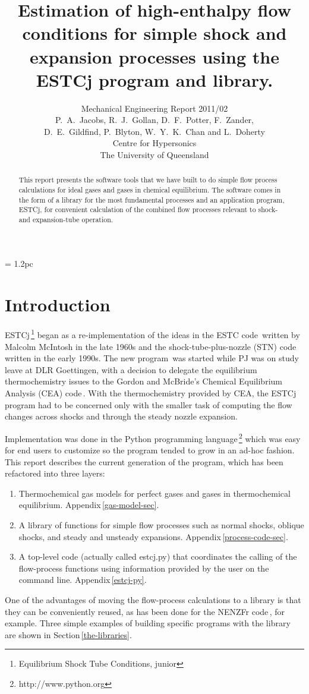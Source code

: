 \documentclass[landscape,12pt,a4paper]{article}
\title{
  Estimation of high-enthalpy flow conditions
  for simple shock and expansion processes using
  the ESTCj program and library.
}
\author{
  Mechanical Engineering Report 2011/02 \\
  P.~A.~Jacobs, R.~J.~Gollan, D.~F.~Potter, F.~Zander,\\
  D.~E.~Gildfind, P.~Blyton, W.~Y.~K.~Chan and L.~Doherty \\
  Centre for Hypersonics\\
  The University of Queensland
}
\begin{document}
\maketitle

\baselineskip = 1.2pc

\begin{abstract}
This report presents the software tools that we have built to do simple
flow process calculations for ideal gases and gases in chemical equilibrium.
The software comes in the form of a library for the most fundamental processes and
an application program, ESTCj, for convenient calculation of 
the combined flow processes relevant to shock- and expansion-tube operation.
\end{abstract}

\newpage
\tableofcontents


\newpage
\section{Introduction}
%
ESTCj\,\footnote{Equilibrium Shock Tube Conditions, junior} 
began as a re-implementation of the ideas in the ESTC code\,\cite{mcintosh_70}
written by Malcolm McIntosh in the late 1960s and 
the shock-tube-plus-nozzle (STN) code\,\cite{krek_jacobs_93} written in the early 1990s.
The new program\,\cite{jacobs_gardner_2003a} was started 
while PJ was on study leave at DLR Goettingen,
with a decision to delegate the equilibrium thermochemistry issues to the 
Gordon and McBride's Chemical Equilibrium Analysis (CEA) 
code\,\cite{gordon_mcbride_1994,mcbride_gordon_1996}.
With the thermochemistry provided by CEA, the ESTCj program had to be concerned
only with the smaller task of computing the flow changes across shocks and through
the steady nozzle expansion.

\medskip
Implementation was done in the Python programming language\,\footnote{http://www.python.org}
which was easy for end users to customize so the program tended to grow in an ad-hoc fashion.
This report describes the current generation of the program, which has been refactored into
three layers:
\begin{enumerate}
 \item Thermochemical gas models for perfect gases and gases in thermochemical equilibrium.
  Appendix\,\ref{gas-model-sec}.
 \item A library of functions for simple flow processes such as normal shocks, oblique shocks,
  and steady and unsteady expansions. Appendix\,\ref{process-code-sec}.
 \item A top-level code (actually called estcj.py) that coordinates the calling 
  of the flow-process functions using information provided by the user on the command line.
  Appendix\,\ref{estcj-py}.
\end{enumerate}
One of the advantages of moving the flow-process calculations to a library is that 
they can be conveniently reused, 
as has been done for the NENZFr code\,\cite{doherty_etal_2012a}, for example.
Three simple examples of building specific programs with the library are shown in
Section\,\ref{the-libraries}.
\end{document}
